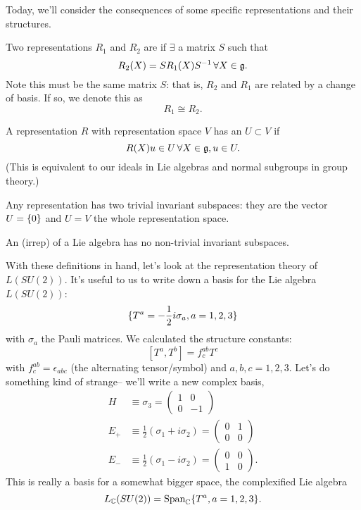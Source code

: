 Today, we'll consider the consequences of some specific representations and their structures.

\begin{defn}
Two representations $R_1$ and $R_2$ are  if $\exists$ a matrix $S$ such that
$$R_2(X)=S R_1(X)S^{-1} \, \forall X\in \mathfrak{g}.$$
Note this must be the same matrix $S$: that is, $R_2$ and $R_1$ are related by a change of basis. If so, we denote this as $$R_1\cong R_2.$$
\end{defn}
\begin{defn}
A representation $R$ with representation space $V$ has an  $U\subset V$ if
$$R(X)u\in U \, \forall X\in \mathfrak{g}, u\in U.$$
(This is equivalent to our ideals in Lie algebras and normal subgroups in group theory.)

Any representation has two trivial invariant subspaces: they are the vector $U=\{0\}$ and $U=V$ the whole representation space.
\end{defn}
\begin{defn}
An  (irrep) of a Lie algebra has no non-trivial invariant subspaces.
\end{defn}

With these definitions in hand, let's look at the representation theory of $L(SU(2))$. It's useful to us to write down a basis for the Lie algebra $L(SU(2))$:
$$\{T^a=-\frac{1}{2}i\sigma_a,a=1,2,3\}$$
with $\sigma_a$ the Pauli matrices. We calculated the structure constants:
$$[T^a,T^b]=f^{ab}_c T^c$$ with $f^{ab}_c=\epsilon_{abc}$ (the alternating tensor/symbol) and $a,b,c=1,2,3$. Let's do something kind of strange-- we'll write a new complex basis,
\begin{align*}
    H&\equiv \sigma_3 = 
        \begin{pmatrix}
            1&0\\0&-1
        \end{pmatrix}\\
    E_+ &\equiv \frac{1}{2}(\sigma_1+i\sigma_2) = 
        \begin{pmatrix}
            0&1\\0&0
        \end{pmatrix}\\
    E_-&\equiv\frac{1}{2}(\sigma_1 - i\sigma_2)= 
        \begin{pmatrix}
            0&0\\1&0
        \end{pmatrix}.
\end{align*}
This is really a basis for a somewhat bigger space, the complexified Lie algebra
$$L_{\mathbb{C}} (SU(2))=\text{Span}_{\mathbb{C}}\{T^a, a=1,2,3\}.$$

